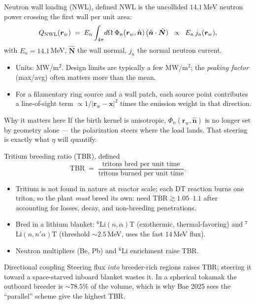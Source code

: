 \documentclass[aspectratio=169]{beamer}
\newcommand{\bn}{\hat{\bm n}}
\newcommand{\bx}{\bm x}
\newcommand{\brw}{\bm r_w}
\begin{document}
\begin{frame}[t]{Neutron wall loading (NWL), defined}
NWL is the uncollided $14.1$\,MeV neutron power crossing the first wall per unit area:
\[
Q_{\rm NWL}(\brw) \;=\; E_n \int_{4\pi} \! d\Omega\; \Phi_n(\brw,\bn)\,(\bn\cdot\hat{\bm N})
\;\;\propto\;\; E_n \, j_n(\brw),
\]
with $E_n=14.1$\,MeV, $\hat{\bm N}$ the wall normal, $j_n$ the normal neutron current.
\begin{itemize}
  \item Units: MW/m$^2$. Design limits are typically a few MW/m$^2$; the \emph{peaking factor} (max/avg) often matters more than the mean.
  \item For a filamentary ring source and a wall patch, each source point contributes a line-of-sight term $\propto 1/|\brw-\bx|^2$ times the emission weight in that direction.
\end{itemize}
\begin{block}{Why it matters here}
If the birth kernel is anisotropic, $\Phi_n(\brw,\bn)$ is no longer set by geometry alone --- the polarization steers where the load lands. That steering is exactly what $\eta$ will quantify.
\end{block}
\end{frame}

\begin{frame}[t]{Tritium breeding ratio (TBR), defined}
\[
\mathrm{TBR} \;=\; \frac{\text{tritons bred per unit time}}{\text{tritons burned per unit time}}.
\]
\begin{itemize}
  \item Tritium is not found in nature at reactor scale; each DT reaction burns one triton, so the plant \emph{must} breed its own: need $\mathrm{TBR}\gtrsim 1.05$--$1.1$ after accounting for losses, decay, and non-breeding penetrations.
  \item Bred in a lithium blanket: $^6$Li$(n,\alpha)$T (exothermic, thermal-favoring) and $^7$Li$(n,n'\alpha)$T (threshold $\sim 2.5$\,MeV, uses the fast $14$\,MeV flux).
  \item Neutron multipliers (Be, Pb) and $^6$Li enrichment raise TBR.
\end{itemize}
\begin{block}{Directional coupling}
Steering flux \emph{into} breeder-rich regions raises TBR; steering it toward a space-starved inboard blanket wastes it. In a spherical tokamak the outboard breeder is $\sim 78.5\%$ of the volume, which is why Bae 2025 sees the ``parallel'' scheme give the highest TBR.
\end{block}
\end{frame}
\end{document}
